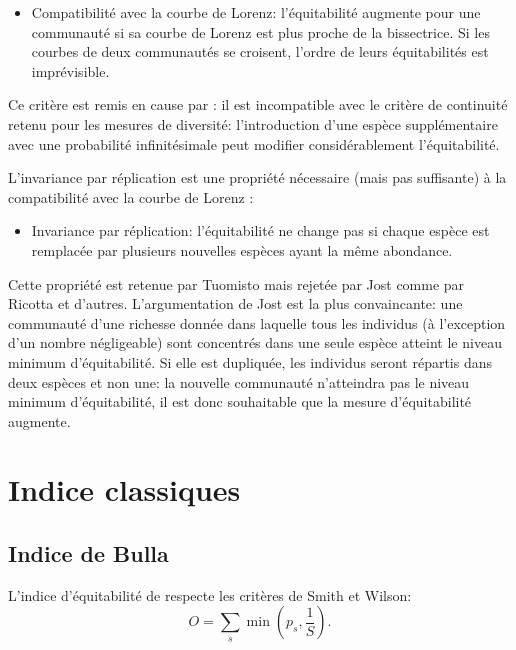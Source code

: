 \documentclass[
  11pt,
  french,
  a4paper,
  extrafontsizes,onecolumn,openright
  ]{memoir}
\providecommand{\tightlist}{%
  \setlength{\itemsep}{0pt}\setlength{\parskip}{0pt}}
\begin{document}
\begin{itemize}
\tightlist
\item
  Compatibilité avec la courbe de Lorenz: l'équitabilité augmente pour une communauté si sa courbe de Lorenz est plus proche de la bissectrice.
  Si les courbes de deux communautés se croisent, l'ordre de leurs équitabilités est imprévisible.
\end{itemize}

Ce critère est remis en cause par \textcite{Ricotta2004}: il est incompatible \autocite{Routledge1983} avec le critère de continuité retenu pour les mesures de diversité: l'introduction d'une espèce supplémentaire avec une probabilité infinitésimale peut modifier considérablement l'équitabilité.

L'invariance par réplication est une propriété nécessaire (mais pas suffisante) à la compatibilité avec la courbe de Lorenz \autocite{Ricotta2004}:

\begin{itemize}
\tightlist
\item
  Invariance par réplication: l'équitabilité ne change pas si chaque espèce est remplacée par plusieurs nouvelles espèces ayant la même abondance.
\end{itemize}

Cette propriété est retenue par Tuomisto mais rejetée par Jost comme par Ricotta et d'autres.
L'argumentation de Jost est la plus convaincante: une communauté d'une richesse donnée dans laquelle tous les individus (à l'exception d'un nombre négligeable) sont concentrés dans une seule espèce atteint le niveau minimum d'équitabilité.
Si elle est dupliquée, les individus seront répartis dans deux espèces et non une: la nouvelle communauté n'atteindra pas le niveau minimum d'équitabilité, il est donc souhaitable que la mesure d'équitabilité augmente.

\hypertarget{indice-classiques}{%
\section{Indice classiques}\label{indice-classiques}}

\hypertarget{indice-de-bulla}{%
\subsection{Indice de Bulla}\label{indice-de-bulla}}

L'indice d'équitabilité de \textcite{Bulla1994} respecte les critères de Smith et Wilson:
\begin{equation}
  \label{eq:Bulla}
  O = \sum_s{\min(p_s,\frac{1}{S})}.
\end{equation}
\end{document}
